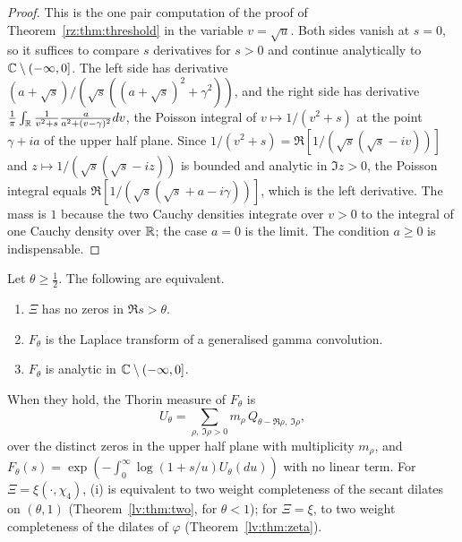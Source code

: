 \begin{proof}
This is the one pair computation of the proof of Theorem~\ref{rz:thm:threshold} in the variable $v=\sqrt u$. Both sides vanish at $s=0$, so it suffices to compare $s$ derivatives for $s>0$ and continue analytically to $\mathbb{C}\setminus(-\infty,0]$. The left side has derivative $(a+\sqrt s)/(\sqrt s((a+\sqrt s)^2+\gamma^2))$, and the right side has derivative $\frac1\pi\int_{\mathbb{R}}\frac1{v^2+s}\frac a{a^2+(v-\gamma)^2}dv$, the Poisson integral of $v\mapsto1/(v^2+s)$ at the point $\gamma+ia$ of the upper half plane. Since $1/(v^2+s)=\Re[1/(\sqrt s(\sqrt s-iv))]$ and $z\mapsto1/(\sqrt s(\sqrt s-iz))$ is bounded and analytic in $\Im z>0$, the Poisson integral equals $\Re[1/(\sqrt s(\sqrt s+a-i\gamma))]$, which is the left derivative. The mass is $1$ because the two Cauchy densities integrate over $v>0$ to the integral of one Cauchy density over $\mathbb{R}$; the case $a=0$ is the limit. The condition $a\ge0$ is indispensable.
\end{proof}

\begin{theorem}\label{lv:thm:thorin}
Let $\theta\ge\frac12$. The following are equivalent.
\begin{enumerate}
\item[(i)] $\Xi$ has no zeros in $\Re s>\theta$.
\item[(ii)] $F_\theta$ is the Laplace transform of a generalised gamma convolution.
\item[(iii)] $F_\theta$ is analytic in $\mathbb{C}\setminus(-\infty,0]$.
\end{enumerate}
When they hold, the Thorin measure of $F_\theta$ is
\begin{equation}\label{lv:eq:Utheta}
U_\theta=\sum_{\rho,\ \Im\rho>0}m_\rho\,Q_{\theta-\Re\rho,\ \Im\rho},
\end{equation}
over the distinct zeros in the upper half plane with multiplicity $m_\rho$, and $F_\theta(s)=\exp(-\int_0^\infty\log(1+s/u)U_\theta(du))$ with no linear term. For $\Xi=\xi(\cdot,\chi_4)$, (i) is equivalent to two weight completeness of the secant dilates on $(\theta,1)$ (Theorem~\ref{lv:thm:two}, for $\theta<1$); for $\Xi=\xi$, to two weight completeness of the dilates of $\varphi$ (Theorem~\ref{lv:thm:zeta}).
\end{theorem}

